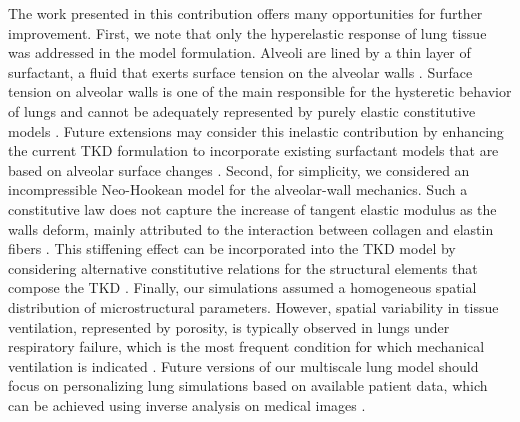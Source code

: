 \documentclass[preprint,3p,12pt,number,sort&compress]{elsarticle}
\begin{document}
The work presented in this contribution offers many opportunities for further improvement. First, we note that only the hyperelastic response of lung tissue was addressed in the model formulation. Alveoli are lined by a thin layer of surfactant, a fluid that exerts surface tension on the alveolar walls \cite{bachofen2001alveolar}. Surface tension on alveolar walls is one of the main responsible for the hysteretic behavior of lungs and cannot be adequately represented by purely elastic constitutive models \cite{QuirosEtal2022}. Future extensions may consider this inelastic contribution by enhancing the current TKD formulation to incorporate existing surfactant models that are based on alveolar surface changes \citet{OtisEtal1994,saad2010dynamic}. Second, for simplicity, we considered an incompressible Neo-Hookean model for the alveolar-wall mechanics. Such a constitutive law does not capture the increase of tangent elastic modulus as the walls deform, mainly attributed to the interaction between collagen and elastin fibers \cite{PerlmanAndWu2014,mead1961mechanical,SukiEtAl2011}. This stiffening effect can be incorporated into the TKD model by considering alternative constitutive relations for the structural elements that compose the TKD \cite{KimmelBudiansky1990}. Finally, our simulations assumed a homogeneous spatial distribution of microstructural parameters. However, spatial variability in tissue ventilation, represented by porosity, is typically observed in lungs under respiratory failure, which is the most frequent condition for which mechanical ventilation is indicated \cite{hurtado2020progression}. Future versions of our multiscale lung model should focus on personalizing lung simulations based on available patient data, which can be achieved using inverse analysis on medical images \cite{PatteEtal2022b}.





 


\end{document}
